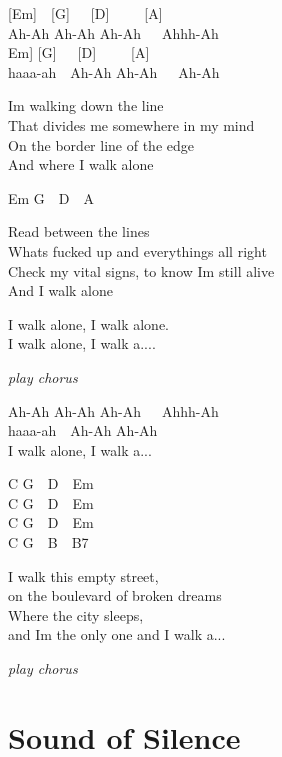\documentclass[
  letterpaper,
  a5paper]{memoir}
\begin{document}
{[}Em{]}~~{[}G{]}~~~{[}D{]}~~~~~{[}A{]}\\
Ah-Ah Ah-Ah Ah-Ah~~~Ahhh-Ah\\
\hspace*{0.333em}\hspace*{0.333em}\hspace*{0.333em}\hspace*{0.333em}{[}Em{]}
{[}G{]}~~~{[}D{]}~~~~~{[}A{]}\\
haaa-ah~~Ah-Ah Ah-Ah~~~Ah-Ah

I\textquotesingle m walking down the line\\
That divides me somewhere in my mind\\
On the border line of the edge\\
And where I walk alone

Em G~~D~~A

Read between the lines\\
What\textquotesingle s fucked up and everything\textquotesingle s all
right\\
Check my vital signs, to know I\textquotesingle m still alive\\
And I walk alone

I walk alone, I walk alone.\\
I walk alone, I walk a....

\emph{play chorus}

Ah-Ah Ah-Ah Ah-Ah~~~Ahhh-Ah\\
haaa-ah~~Ah-Ah Ah-Ah~~\\
I walk alone, I walk a...

C G~~D~~Em\\
C G~~D~~Em\\
C G~~D~~Em\\
C G~~B~~B7

I walk this empty street,\\
on the boulevard of broken dreams\\
Where the city sleeps,\\
and I\textquotesingle m the only one and I walk a...

\emph{play chorus}

\hypertarget{sound-of-silence}{%
\chapter{Sound of Silence}\label{sound-of-silence}}
\end{document}
